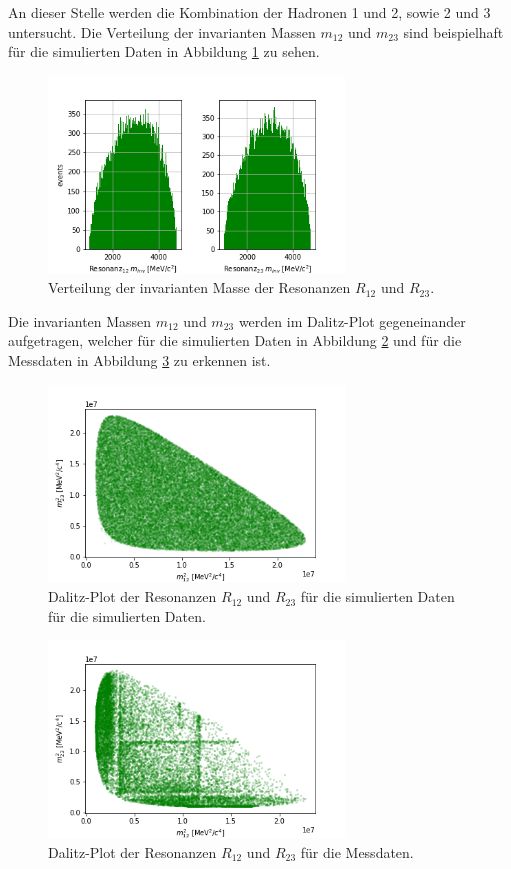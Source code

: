An dieser Stelle werden die Kombination der Hadronen 1 und 2, sowie 2 und 3 untersucht. Die Verteilung der invarianten Massen $m_{12}$ und $m_{23}$ sind beispielhaft für die simulierten Daten in Abbildung \ref{fig:HistRes} zu sehen.
\begin{figure}
  \centering
  \includegraphics[width=0.7\textwidth]{plots/sim_Xmes_M.png}
  \caption{Verteilung der invarianten Masse der Resonanzen $R_{12}$ und $R_{23}$.}
  \label{fig:HistRes}
\end{figure}
\FloatBarrier
Die invarianten Massen $m_{12}$ und $m_{23}$ werden im Dalitz-Plot gegeneinander aufgetragen, welcher für die simulierten Daten in Abbildung \ref{fig:Dalitz_sim} und für die Messdaten in Abbildung \ref{fig:Dalitz_real} zu erkennen ist.
\begin{figure}
  \centering
  \includegraphics[width=0.7\textwidth]{plots/dalitz_sim.png}
  \caption{Dalitz-Plot der Resonanzen $R_{12}$ und $R_{23}$ für die simulierten Daten für die simulierten Daten.}
  \label{fig:Dalitz_sim}
\end{figure}
\FloatBarrier
\begin{figure}
  \centering
  \includegraphics[width=0.7\textwidth]{plots/dalitz_real.png}
  \caption{Dalitz-Plot der Resonanzen $R_{12}$ und $R_{23}$ für die Messdaten.}
  \label{fig:Dalitz_real}
\end{figure}
